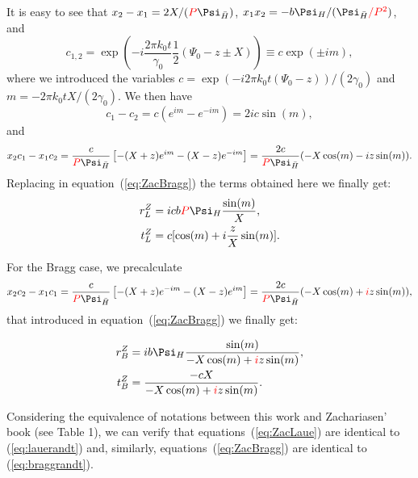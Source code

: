 \documentclass[preprint]{iucr}              %
\newcommand{\inred}[1]{{\color{red}#1}}
\begin{document}
It is easy to see that $x_2-x_1=2 X / (\inred{P}\Psi_{\bar{H}})$, $x_1 x_2 = -b \Psi_H/(\Psi_{\bar{H}} \inred{/P^2})$, and 
\begin{equation}
  c_{1,2} = \exp
  \left(-i\frac{2 \pi k_0 t}{\gamma_0} \frac{1}{2} (\Psi_0-z \pm X)\right)\equiv c \exp(\pm i m), 
\end{equation}
where we introduced the variables $c=\exp(-i2\pi k_0 t  (\Psi_0-z)) / (2 \gamma_0)$ and $m=-2\pi k_0 t X / (2 \gamma_0)$. We then have
\begin{equation}
    c_1-c_2=c(e^{im}-e^{-im})=2ic \sin(m), 
\end{equation}
and
\begin{equation}
    x_2 c_1 - x_1 c_2 = \frac{c}{\inred{P} \Psi_{\bar{H}}} \left[ 
 -(X+z)e^{im}-(X-z)e^{-im}\right] =
 \frac{2 c}{\inred{P} \Psi_{\bar{H}}}(-X \cos(m) - i z \sin(m)).
\end{equation}
Replacing in equation~(\ref{eq:ZacBragg}) the terms obtained here  we finally get:
	\begin{subequations}
	\label{eq:ZacBragg2}
    \begin{align}
	r^Z_{L} &=  i c b \inred{P} \Psi_H \frac{\sin(m)}{X}, \\
 	t^Z_{L} &= c [\cos(m) + i\frac{z}{X} \sin(m)].   
    \end{align}
    \end{subequations}

For the Bragg case, we precalculate
\begin{equation}
    x_2 c_2 - x_1 c_1 = \frac{c}{\inred{P} \Psi_{\bar{H}}} \left[ 
 -(X+z)e^{-im}-(X-z)e^{im}\right] =
 \frac{2c}{\inred{P} \Psi_{\bar{H}}}(-X \cos(m) + \inred{i} z \sin(m)),
\end{equation}
that introduced in equation~(\ref{eq:ZacBragg}) we finally get:

	\label{eq:ZacLaue2}
    \begin{subequations}
    \begin{align}
	r^Z_{B} &=  i b \Psi_H \frac{\sin(m)}{ - X \cos(m) + \inred{i} z \sin(m)}, \\
 	t^Z_{B} &= \frac{ -c X}{-X \cos(m) + \inred{i} z \sin(m)}.   
    \end{align}
    \end{subequations}

Considering the equivalence of notations between this work and Zachariasen' book (see Table 1), we can verify that equations~(\ref{eq:ZacLaue}) are identical to (\ref{eq:lauerandt}) and, similarly,  equations~(\ref{eq:ZacBragg}) are identical to (\ref{eq:braggrandt}).
\end{document}
